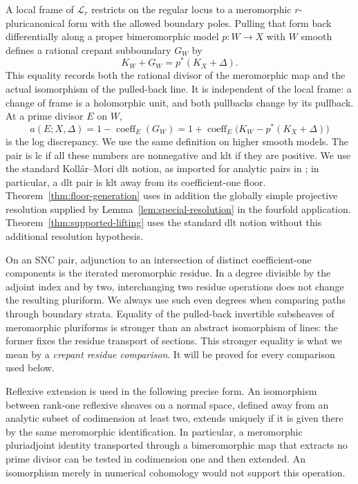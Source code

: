 A local frame of \(\mathscr L_r\) restricts on the regular locus to a
meromorphic \(r\)-pluricanonical form with the allowed boundary poles.
Pulling that form back differentially along a proper bimeromorphic model
\(p:W\to X\) with \(W\) smooth defines a rational crepant subboundary \(G_W\) by
\begin{equation}
 K_W+G_W=p^*(K_X+\Delta).
 \label{eq:crepant}
\end{equation}
This equality records both the rational divisor of the meromorphic map
and the actual isomorphism of the pulled-back line.  It is independent
of the local frame: a change of frame is a holomorphic unit, and both
pullbacks change by its pullback.  At a prime divisor \(E\) on \(W\),
\[
 a(E;X,\Delta)=1-\operatorname{coeff}_E(G_W)
 =1+\operatorname{coeff}_E\bigl(K_W-p^*(K_X+\Delta)\bigr)
\]
is the log discrepancy.  We use the same definition on higher smooth
models.  The pair is lc if all these numbers are nonnegative and klt if
they are positive.  We use the standard Koll\'ar--Mori dlt notion, as
imported for analytic pairs in
\cite[Definition~2.7(4)]{DasHaconPaun2024}; in particular, a dlt pair is
klt away from its coefficient-one floor.  Theorem~\ref{thm:floor-generation}
uses in addition the globally simple projective resolution supplied by
Lemma~\ref{lem:special-resolution} in the fourfold application.
Theorem~\ref{thm:supported-lifting} uses the standard dlt notion without
this additional resolution hypothesis.

On an SNC pair, adjunction to an intersection of distinct coefficient-one
components is the iterated meromorphic residue.  In a degree divisible
by the adjoint index and by two, interchanging two residue operations
does not change the resulting pluriform.  We always use such even degrees
when comparing paths through boundary strata.  Equality of the pulled-back
invertible subsheaves of meromorphic pluriforms is stronger than an abstract
isomorphism of lines: the former fixes the residue transport of sections.
This stronger equality is what we mean by a \emph{crepant residue
comparison}.  It will be proved for every comparison used below.

Reflexive extension is used in the following precise form.  An isomorphism
between rank-one reflexive sheaves on a normal space, defined away from an
analytic subset of codimension at least two, extends uniquely if it is
given there by the same meromorphic identification.  In particular, a
meromorphic pluriadjoint identity transported through a bimeromorphic map
that extracts no prime divisor can be tested in codimension one and then
extended.  An isomorphism merely in numerical cohomology would not support
this operation.

